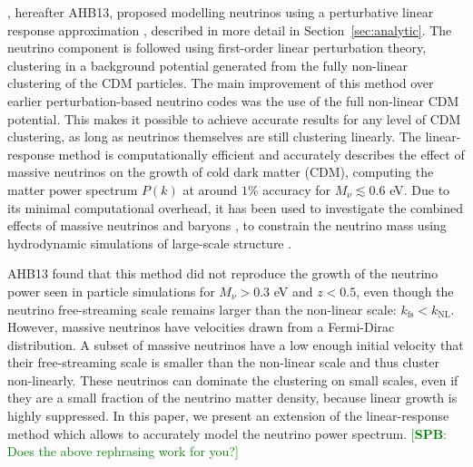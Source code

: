 \documentclass[useAMS, usenatbib]{mnras}
\newcommand{\spb}[1]{{\textcolor{green}{[{\bf SPB}: #1]}}}
\begin{document}
\cite{AHB}, hereafter AHB13, proposed modelling neutrinos using a perturbative linear response approximation \citep{Bond_1980, Ma_1994}, described in more detail in Section~\ref{sec:analytic}. The neutrino component is followed using first-order linear perturbation theory, clustering in a background potential generated from the fully non-linear clustering of the CDM particles. The main improvement of this method over earlier perturbation-based neutrino codes \citep{Brandbyge_2009} was the use of the full non-linear CDM potential. This makes it possible to achieve accurate results for any level of CDM clustering, as long as neutrinos themselves are still clustering linearly.
The linear-response method is computationally efficient and accurately describes the effect of massive neutrinos on the growth of cold dark matter (CDM), computing the matter power spectrum $P(k)$ at around $1\%$ accuracy for $M_\nu \lesssim 0.6$ eV.
Due to its minimal computational overhead,
it has been used to investigate the combined effects of massive neutrinos and baryons \citep{Mummery_2017}, to constrain
the neutrino mass using hydrodynamic simulations of large-scale structure \citep{McCarthy_2017, McCarthy_2018}.

AHB13 found that this method did not reproduce the growth of the neutrino power seen in particle simulations for $M_\nu > 0.3$ eV  and $z < 0.5$, even though the neutrino free-streaming scale remains larger than the non-linear scale: $k_\mathrm{fs} < k_\mathrm{NL}$. However, massive neutrinos have velocities drawn from a Fermi-Dirac distribution. A subset of massive neutrinos have a low enough initial velocity that their free-streaming scale is smaller than the non-linear scale and thus cluster non-linearly. These neutrinos can dominate the clustering on small scales, even if they are a small fraction of the neutrino matter density, because linear growth is highly suppressed. In this paper, we present an extension of the linear-response method which allows to accurately model the neutrino power spectrum. \spb{Does the above rephrasing work for you?}

\end{document}
